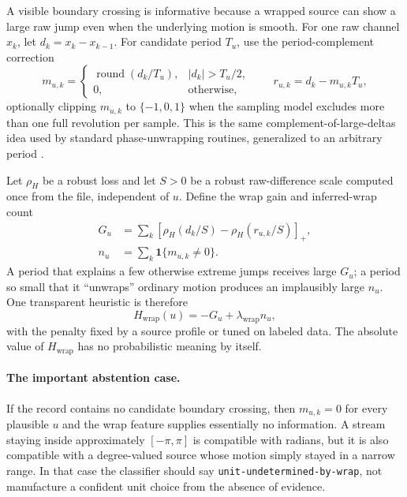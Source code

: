 \documentclass[11pt]{article}
\newcommand{\abs}[1]{\left\lvert #1 \right\rvert}
\begin{document}
    A visible boundary crossing is informative because a wrapped source can show a large raw
    jump even when the underlying motion is smooth. For one raw channel $x_k$, let
    $d_k=x_k-x_{k-1}$. For candidate period $T_u$, use the period-complement correction
    \begin{equation}
        m_{u,k}=\begin{cases}
                    \operatorname{round}(d_k/T_u), & \abs{d_k}>T_u/2,\\
                    0, & \text{otherwise},
        \end{cases}
        \qquad
        r_{u,k}=d_k-m_{u,k}T_u,
        \label{eq:wrap-correction}
    \end{equation}
    optionally clipping $m_{u,k}$ to $\{-1,0,1\}$ when the sampling model excludes more than
    one full revolution per sample. This is the same complement-of-large-deltas idea used
    by standard phase-unwrapping routines, generalized to an arbitrary period
    \cite{numpyUnwrap}.

    Let $\rho_H$ be a robust loss and let $S>0$ be a robust raw-difference scale computed
    once from the file, independent of $u$. Define the wrap gain and inferred-wrap count
    \begin{align}
        G_u &= \sum_k
        \left[
            \rho_H(d_k/S)-\rho_H(r_{u,k}/S)
        \right]_+,\\
        n_u &= \sum_k \mathbf 1\{m_{u,k}\ne0\}.
    \end{align}
    A period that explains a few otherwise extreme jumps receives large $G_u$; a period so
    small that it ``unwraps'' ordinary motion produces an implausibly large $n_u$. One
    transparent heuristic is therefore
    \begin{equation}
        H_{\mathrm{wrap}}(u)
        =-G_u+\lambda_{\mathrm{wrap}}n_u,
        \label{eq:wrap-heuristic}
    \end{equation}
    with the penalty fixed by a source profile or tuned on labeled data. The absolute value
    of $H_{\mathrm{wrap}}$ has no probabilistic meaning by itself.

    \paragraph{The important abstention case.}
    If the record contains no candidate boundary crossing, then $m_{u,k}=0$ for every
    plausible $u$ and the wrap feature supplies essentially no information. A stream staying
    inside approximately $[-\pi,\pi]$ is compatible with radians, but it is also compatible
    with a degree-valued source whose motion simply stayed in a narrow range. In that case
    the classifier should say \texttt{unit-undetermined-by-wrap}, not manufacture a confident
    unit choice from the absence of evidence.
\end{document}
